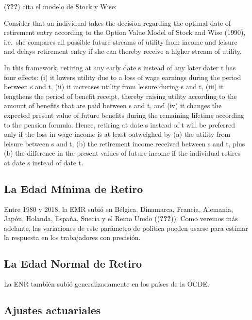 \documentclass[]{article}
\begin{document}
({\textbf{???}}) cita el modelo de Stock y Wise:

Consider that an individual takes the decision regarding the optimal
date of retirement entry according to the Option Value Model of Stock
and Wise (1990), i.e.~she compares all possible future streams of
utility from income and leisure and delays retirement entry if she can
thereby receive a higher stream of utility.

In this framework, retiring at any early date s instead of any later
dater t has four effects: (i) it lowers utility due to a loss of wage
earnings during the period between s and t, (ii) it increases utility
from leisure during s and t, (iii) it lengthens the period of benefit
receipt, thereby raising utility according to the amount of benefits
that are paid between s and t, and (iv) it changes the expected present
value of future benefits during the remaining lifetime according to the
pension formula. Hence, retiring at date s instead of t will be
preferred only if the loss in wage income is at least outweighed by (a)
the utility from leisure between s and t, (b) the retirement income
received between s and t, plus (b) the difference in the present values
of future income if the individual retires at date s instead of date t.

\hypertarget{la-edad-muxednima-de-retiro}{%
\subsection{La Edad Mínima de
Retiro}\label{la-edad-muxednima-de-retiro}}

Entre 1980 y 2018, la EMR subió en Bélgica, Dinamarca, Francia,
Alemania, Japón, Holanda, España, Suecia y el Reino Unido
(({\textbf{???}})). Como veremos más adelante, las variaciones de este
parámetro de política pueden usarse para estimar la respuesta en los
trabajadores con precisión.

\hypertarget{la-edad-normal-de-retiro}{%
\subsection{La Edad Normal de Retiro}\label{la-edad-normal-de-retiro}}

La ENR también subió generalizadamente en los países de la OCDE.

\hypertarget{ajustes-actuariales}{%
\subsection{Ajustes actuariales}\label{ajustes-actuariales}}
\end{document}
